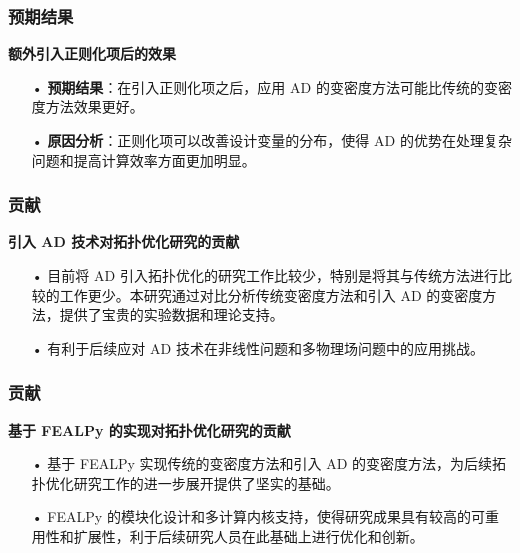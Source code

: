\documentclass{beamer}
\numberwithin{subsection}{section}
\begin{document}
\begin{frame}
    \frametitle{预期结果}
    \textbf{额外引入正则化项后的效果}
    \begin{itemize}
        \item[•]\textbf{预期结果}：在引入正则化项之后，应用 AD 的变密度方法可能比传统的变密度方法效果更好。
        \vspace{0.3cm}
        \item[•]\textbf{原因分析}：正则化项可以改善设计变量的分布，使得 AD 的优势在处理复杂问题和提高计算效率方面更加明显。
    \end{itemize}
\end{frame}

\begin{frame}
    \frametitle{贡献}
    \textbf{引入 AD 技术对拓扑优化研究的贡献}
    \begin{itemize}
        \item[•]目前将 AD 引入拓扑优化的研究工作比较少，特别是将其与传统方法进行比较的工作更少。本研究通过对比分析传统变密度方法和引入 AD 的变密度方法，提供了宝贵的实验数据和理论支持。
        \vspace{0.3cm}
        \item[•]有利于后续应对 AD 技术在非线性问题和多物理场问题中的应用挑战。
    \end{itemize}
\end{frame}

\begin{frame}
    \frametitle{贡献}
    \textbf{基于 FEALPy 的实现对拓扑优化研究的贡献}
    \begin{itemize}
        \item[•]基于 FEALPy 实现传统的变密度方法和引入 AD 的变密度方法，为后续拓扑优化研究工作的进一步展开提供了坚实的基础。
        \vspace{0.3cm}
        \item[•]FEALPy 的模块化设计和多计算内核支持，使得研究成果具有较高的可重用性和扩展性，利于后续研究人员在此基础上进行优化和创新。
    \end{itemize}
\end{frame}

\end{document}
